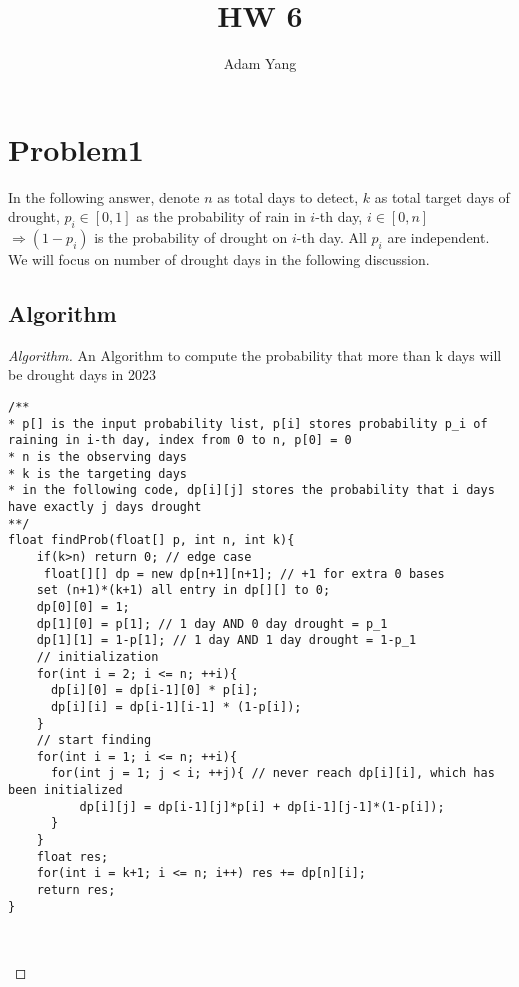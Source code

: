 \documentclass[openany]{article}
\begin{document}
\title{HW 6}
\author{Adam Yang}
\maketitle




\section*{Problem1}

In the following answer, denote $n$ as total days to detect, $k$ as total target days of drought, $p_i\in [0,1]$ as the probability of rain in $i$-th day, $i\in [0,n]$ $\Rightarrow (1-p_i)$ is the probability of drought on $i$-th day. All $p_i$ are independent. We will focus on number of drought days in the following discussion.

\subsection*{Algorithm}
\begin{proof}[Algorithm]{}
		\renewcommand{\qedsymbol}{}
		An Algorithm to compute the probability that more than k days will be drought days in 2023
		\begin{lstlisting}[basicstyle=\fontsize{8}{9}\selectfont\ttfamily]
/**
* p[] is the input probability list, p[i] stores probability p_i of raining in i-th day, index from 0 to n, p[0] = 0
* n is the observing days
* k is the targeting days
* in the following code, dp[i][j] stores the probability that i days have exactly j days drought
**/
float findProb(float[] p, int n, int k){
    if(k>n) return 0; // edge case
	 float[][] dp = new dp[n+1][n+1]; // +1 for extra 0 bases
    set (n+1)*(k+1) all entry in dp[][] to 0;
    dp[0][0] = 1;
    dp[1][0] = p[1]; // 1 day AND 0 day drought = p_1
    dp[1][1] = 1-p[1]; // 1 day AND 1 day drought = 1-p_1
    // initialization
    for(int i = 2; i <= n; ++i){
      dp[i][0] = dp[i-1][0] * p[i];
      dp[i][i] = dp[i-1][i-1] * (1-p[i]);
    }
    // start finding
    for(int i = 1; i <= n; ++i){
      for(int j = 1; j < i; ++j){ // never reach dp[i][i], which has been initialized
          dp[i][j] = dp[i-1][j]*p[i] + dp[i-1][j-1]*(1-p[i]);
      }
    }
    float res;
    for(int i = k+1; i <= n; i++) res += dp[n][i];
    return res;
}

        
		\end{lstlisting} 
\end{proof}
\end{document}
